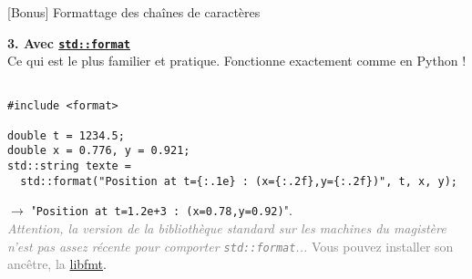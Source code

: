 \documentclass[c]{beamer}
\begin{document}
\begin{frame}[fragile]{[Bonus] Formattage des chaînes de caractères}

\large{\textbf{3. Avec \href{https://en.cppreference.com/w/cpp/utility/format}{\texttt{std::format}}}}\\
  
Ce qui est le plus familier et pratique. Fonctionne exactement comme en Python !

\begin{verbatim}

#include <format>

double t = 1234.5;
double x = 0.776, y = 0.921;
std::string texte =
  std::format("Position at t={:.1e} : (x={:.2f},y={:.2f})", t, x, y);

\end{verbatim}

$\rightarrow$ "\texttt{Position at t=1.2e+3 : (x=0.78,y=0.92)}".\\

{\small\textcolor{gray}{\textit{Attention, la version de la bibliothèque standard sur les machines du magistère n'est pas assez récente pour comporter \texttt{std::format}...} Vous pouvez installer son ancêtre, la \href{https://fmt.dev/latest/index.html}{libfmt}}.}

\end{frame}

\end{document}
